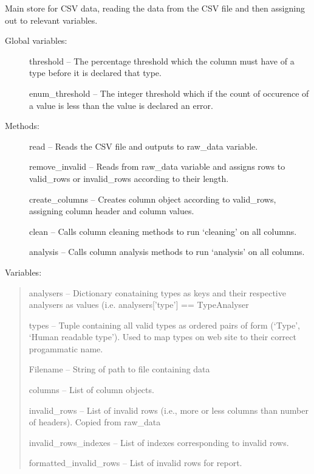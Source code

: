 \documentclass[letterpaper,10pt,english]{sphinxmanual}
\begin{document}

\begin{fulllineitems}
\label{Code_rst/dat:data.Data}
Main store for CSV data, reading the data from the CSV file and then 
assigning out to relevant variables.
\begin{description}
\item[{Global variables:}] \leavevmode
threshold -- The percentage threshold which the column must have of a type before
it is declared that type.

enum\_threshold -- The integer threshold which if the count of occurence of a value is
less than the value is declared an error.

\item[{Methods:}] \leavevmode
read -- Reads the CSV file and outputs to raw\_data variable.

remove\_invalid -- Reads from raw\_data variable and assigns rows to 
valid\_rows or invalid\_rows according to their length.

create\_columns -- Creates column object according to valid\_rows, assigning
column header and column values.

clean -- Calls column cleaning methods to run `cleaning' on all columns.

analysis -- Calls column analysis methods to run `analysis' on all columns.

\end{description}

Variables:
\begin{quote}

analysers -- Dictionary conataining types as keys and their respective
analysers as values (i.e. analysers{[}'type'{]} == TypeAnalyser

types -- Tuple containing all valid types as ordered pairs of form 
(`Type', `Human readable type'). Used to map types on web site
to their correct progammatic name.

Filename -- String of path to file containing data

columns -- List of column objects.

invalid\_rows -- List of invalid rows (i.e., more or less columns than
number of headers). Copied from raw\_data

invalid\_rows\_indexes -- List of indexes corresponding to invalid rows.

formatted\_invalid\_rows -- List of invalid rows for report.


\end{quote}
\end{fulllineitems}
\end{document}
